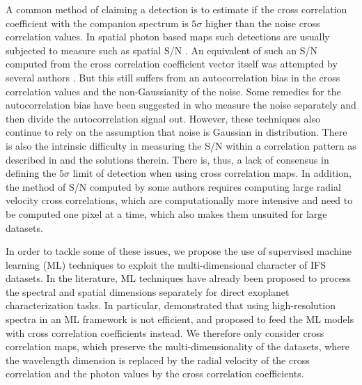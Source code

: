 \documentclass{aa}
\begin{document}
A common method of claiming a detection is to estimate if the cross correlation coefficient with the companion spectrum is $5\sigma$ higher than the noise cross correlation values.
In spatial photon based maps such detections are usually subjected to measure such as spatial S/N \citep[][]{2014MawetSNR}.
An equivalent of such an S/N computed from the cross correlation coefficient vector itself was attempted by several authors \citep[e.g., ][]{2018AHoeijmakersMM}.
But this still suffers from an autocorrelation bias in the cross correlation values and the non-Gaussianity of the noise.
Some remedies for the autocorrelation bias have been suggested in \citet[][]{ruffio2019radial} who measure the noise separately and then divide the autocorrelation signal out.
However, these techniques also continue to rely on the assumption that noise is Gaussian in distribution.
There is also the intrinsic difficulty in measuring the S/N within a correlation pattern as described in \cite{2023Malin} and the solutions therein. There is, thus, a lack of consensus in defining the $5\sigma$ limit of detection when using cross correlation maps.
In addition, the method of S/N computed by some authors \citep[e.g in][]{2021Cugno} requires computing large radial velocity cross correlations, which are computationally more intensive and need to be computed one pixel at a time, which also makes them unsuited for large datasets.

In order to tackle some of these issues, we propose the use of supervised machine learning (ML) techniques to exploit the multi-dimensional character of IFS datasets. In the literature, ML techniques have already been proposed to process the spectral and spatial dimensions separately for direct exoplanet characterization tasks. In particular, \citet{2020Fisher} demonstrated that using high-resolution spectra in an ML framework is not efficient, and proposed to feed the ML models with cross correlation coefficients instead. 
We therefore only consider cross correlation maps, which preserve the multi-dimensionality of the datasets, where the wavelength dimension is replaced by the radial velocity of the cross correlation and the photon values by the cross correlation coefficients. 
\end{document}

